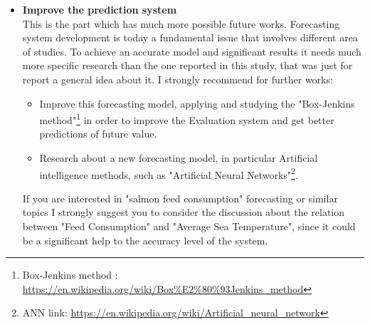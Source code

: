 \begin{itemize}
\newpage

\item \textbf{Improve the prediction system}\\ This is the part which has much more possible future works. Forecasting system development is today a fundamental issue that involves different area of studies. To achieve an accurate model and significant results it needs much more specific research than the one reported in this study, that was just for report a general idea about it. I strongly recommend for further works:
\begin{itemize}
\item Improve this forecasting model, applying and studying the "Box-Jenkins method"\footnote{Box-Jenkins method : \url{https://en.wikipedia.org/wiki/Box\%E2\%80\%93Jenkins\_method}} in order to improve the Evaluation system and get better predictions of future value.
\item Research about a new forecasting model, in particular Artificial intelligence methods, such as "Artificial Neural Networks"\footnote{ANN link: \url{https://en.wikipedia.org/wiki/Artificial\_neural\_network}}.
\end{itemize}

If you are interested in "salmon feed consumption" forecasting or similar topics I strongly suggest you to consider the discussion about the relation between "Feed Consumption" and "Average Sea Temperature", since it could be a significant help to the accuracy level of the system.

\end{itemize}




